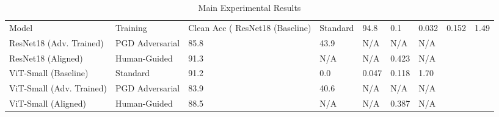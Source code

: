 \begin{table}[h]
\centering
\caption{Main Experimental Results}
\label{tab:main_results}
\begin{tabular}{lllllll}
\toprule
Model & Training & Clean Acc (%
\midrule
ResNet18 (Baseline) & Standard & 94.8 & 0.1 & 0.032 & 0.152 & 1.49 \\
ResNet18 (Adv. Trained) & PGD Adversarial & 85.8 & 43.9 & N/A & N/A & N/A \\
ResNet18 (Aligned) & Human-Guided & 91.3 & N/A & N/A & 0.423 & N/A \\
ViT-Small (Baseline) & Standard & 91.2 & 0.0 & 0.047 & 0.118 & 1.70 \\
ViT-Small (Adv. Trained) & PGD Adversarial & 83.9 & 40.6 & N/A & N/A & N/A \\
ViT-Small (Aligned) & Human-Guided & 88.5 & N/A & N/A & 0.387 & N/A \\
\bottomrule
\end{tabular}
\end{table}
